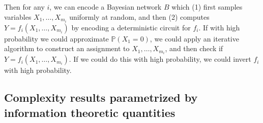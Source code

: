\documentclass{article}
\begin{document}
\noindent Then for any $i$, we can encode a Bayesian network $B$ which (1) first samples variables $X_1, \dots, X_{m_i}$ uniformly at random, and then (2) computes $Y = f_i(X_1, \dots, X_{m_i})$ by encoding a deterministic circuit for $f_i$.
If with high probability we could approximate $\mathbb{P}(X_1 = 0)$, we could apply an iterative algorithm to construct an assignment to $X_1, \dots, X_{m_i}$, and then check if $Y = f_i(X_1, \dots, X_{m_i})$.  If we could do this with high probability, we could invert $f_i$ with high probability.

\subsection{Complexity results parametrized by information theoretic quantities}
\end{document}
